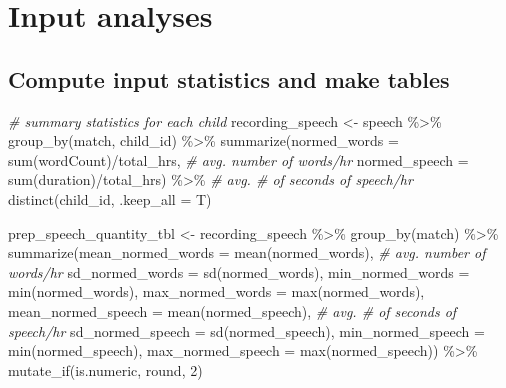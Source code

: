 \documentclass[
]{article}
\newenvironment{Shaded}{\begin{snugshade}}{\end{snugshade}}
\newcommand{\AttributeTok}[1]{\textcolor[rgb]{0.77,0.63,0.00}{#1}}
\newcommand{\CommentTok}[1]{\textcolor[rgb]{0.56,0.35,0.01}{\textit{#1}}}
\newcommand{\DecValTok}[1]{\textcolor[rgb]{0.00,0.00,0.81}{#1}}
\newcommand{\FunctionTok}[1]{\textcolor[rgb]{0.00,0.00,0.00}{#1}}
\newcommand{\NormalTok}[1]{#1}
\newcommand{\OtherTok}[1]{\textcolor[rgb]{0.56,0.35,0.01}{#1}}
\newcommand{\SpecialCharTok}[1]{\textcolor[rgb]{0.00,0.00,0.00}{#1}}
\begin{document}
\hypertarget{input-analyses}{%
\section{Input analyses}\label{input-analyses}}

\hypertarget{compute-input-statistics-and-make-tables}{%
\subsection{Compute input statistics and make tables}\label{compute-input-statistics-and-make-tables}}

\begin{Shaded}
\begin{Highlighting}[]
\CommentTok{\# summary statistics for each child }
\NormalTok{recording\_speech }\OtherTok{\textless{}{-}}\NormalTok{ speech }\SpecialCharTok{\%\textgreater{}\%}
  \FunctionTok{group\_by}\NormalTok{(match, child\_id) }\SpecialCharTok{\%\textgreater{}\%}
  \FunctionTok{summarize}\NormalTok{(}\AttributeTok{normed\_words =} \FunctionTok{sum}\NormalTok{(wordCount)}\SpecialCharTok{/}\NormalTok{total\_hrs, }\CommentTok{\# avg. number of words/hr}
            \AttributeTok{normed\_speech =} \FunctionTok{sum}\NormalTok{(duration)}\SpecialCharTok{/}\NormalTok{total\_hrs) }\SpecialCharTok{\%\textgreater{}\%}  \CommentTok{\# avg. \# of seconds of speech/hr}
  \FunctionTok{distinct}\NormalTok{(child\_id, }\AttributeTok{.keep\_all =}\NormalTok{ T) }

\NormalTok{prep\_speech\_quantity\_tbl }\OtherTok{\textless{}{-}}\NormalTok{ recording\_speech }\SpecialCharTok{\%\textgreater{}\%}
  \FunctionTok{group\_by}\NormalTok{(match) }\SpecialCharTok{\%\textgreater{}\%}
  \FunctionTok{summarize}\NormalTok{(}\AttributeTok{mean\_normed\_words =} \FunctionTok{mean}\NormalTok{(normed\_words), }\CommentTok{\# avg. number of words/hr}
            \AttributeTok{sd\_normed\_words =} \FunctionTok{sd}\NormalTok{(normed\_words),}
            \AttributeTok{min\_normed\_words =} \FunctionTok{min}\NormalTok{(normed\_words),}
            \AttributeTok{max\_normed\_words =} \FunctionTok{max}\NormalTok{(normed\_words),}
            \AttributeTok{mean\_normed\_speech =} \FunctionTok{mean}\NormalTok{(normed\_speech),  }\CommentTok{\# avg. \# of seconds of speech/hr}
            \AttributeTok{sd\_normed\_speech =} \FunctionTok{sd}\NormalTok{(normed\_speech),}
            \AttributeTok{min\_normed\_speech =} \FunctionTok{min}\NormalTok{(normed\_speech),}
            \AttributeTok{max\_normed\_speech =} \FunctionTok{max}\NormalTok{(normed\_speech)) }\SpecialCharTok{\%\textgreater{}\%}
  \FunctionTok{mutate\_if}\NormalTok{(is.numeric, round, }\DecValTok{2}\NormalTok{)}


\end{Highlighting}
\end{Shaded}
\end{document}

